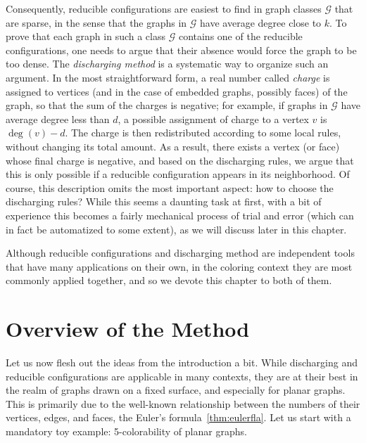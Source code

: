 \documentclass[12pt,twoside,openright,a4paper]{book}
\newcommand{\GG}{\mathcal{G}}
\begin{document}
Consequently, reducible configurations are easiest to find in graph classes $\GG$ that are sparse, in the
sense that the graphs in $\GG$ have average degree close to $k$. To prove that each graph in such a class $\GG$
contains one of the reducible configurations, one needs to argue that their absence would force the graph to be
too dense.  The \emph{discharging method} is a systematic way to organize such an argument.  In the most straightforward
form, a real number called \emph{charge} is assigned to vertices (and in the case of embedded graphs, possibly faces)
of the graph, so that the sum of the charges is negative; for example, if graphs in $\GG$ have average degree less than $d$,
a possible assignment of charge to a vertex $v$ is $\deg(v)-d$.  The charge is then redistributed according to some local
rules, without changing its total amount.  As a result, there exists a vertex (or face) whose final charge is negative,
and based on the discharging rules, we argue that this is only possible if a reducible configuration appears in its neighborhood.
Of course, this description omits the most important aspect: how to choose the discharging rules?
While this seems a daunting task at first, with a bit of experience this becomes a fairly mechanical process of trial and error
(which can in fact be automatized to some extent), as we will discuss later in this chapter.

Although reducible configurations and discharging method are independent tools that have many applications on their
own, in the coloring context they are most commonly applied together, and so we devote this chapter to both of them.

\section{Overview of the Method}

Let us now flesh out the ideas from the introduction a bit.  While discharging and reducible configurations
are applicable in many contexts, they are at their best in the realm of graphs drawn on a fixed surface, and
especially for planar graphs.  This is primarily due to the well-known relationship between the numbers
of their vertices, edges, and faces, the Euler's formula~\ref{thm:eulerfla}.
Let us start with a mandatory toy example: 5-colorability of planar graphs.
\end{document}
